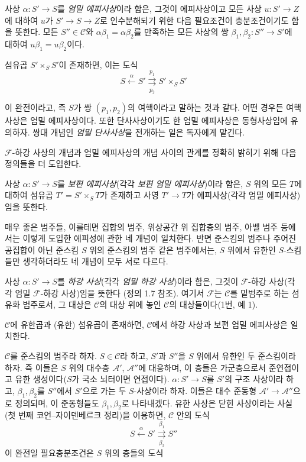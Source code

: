  사상 $\alpha:S'\longrightarrow S$를
\emph{엄밀 에피사상}이라 함은, 그것이 에피사상이고 모든 사상
$u:S'\longrightarrow Z$에 대하여 $u$가
$S'\longrightarrow S\longrightarrow Z$로 인수분해되기 위한 다음
필요조건이 충분조건이기도 함을 뜻한다. 모든 $S''\in\mathcal C$와
$\alpha\beta_1=\alpha\beta_2$를 만족하는 모든 사상의 쌍
$\beta_1,\beta_2:S''\longrightarrow S'$에 대하여
$u\beta_1=u\beta_2$이다.

섬유곱 $S'\times_S S'$이 존재하면, 이는 도식
\[
  S\xleftarrow{\alpha}S'
  \overset{p_1}{\underset{p_2}{\rightrightarrows}}S'\times_S S'
\]

이 완전이라고, 즉 $S$가 쌍 $(p_1,p_2)$의 여핵이라고 말하는 것과
같다. 어떤 경우든 여핵 사상은 엄밀 에피사상이다. 또한 단사사상이기도
한 엄밀 에피사상은 동형사상임에 유의하자. 쌍대 개념인
\emph{엄밀 단사사상}을 전개하는 일은 독자에게 맡긴다.

$\mathcal F$-하강 사상의 개념과 엄밀 에피사상의 개념 사이의 관계를
정확히 밝히기 위해 다음 정의들을 더 도입한다.

 사상 $\alpha:S'\longrightarrow S$를
\emph{보편 에피사상}(각각 \emph{보편 엄밀 에피사상})이라 함은,
$S$ 위의 모든 $T$에 대하여 섬유곱 $T'=S'\times_ST$가 존재하고
사영 $T'\longrightarrow T$가 에피사상(각각 엄밀 에피사상)임을 뜻한다.

매우 좋은 범주들, 이를테면 집합의 범주, 위상공간 위 집합층의 범주,
아벨 범주 등에서는 이렇게 도입한 에피성에 관한 네 개념이 일치한다.
반면 준스킴의 범주나 주어진 공집합이 아닌 준스킴 $S$ 위의 준스킴의
범주 같은 범주에서는, $S$ 위에서 유한인 $S$-스킴들만 생각하더라도
네 개념이 모두 서로 다르다.

 사상 $\alpha:S'\longrightarrow S$를
\emph{하강 사상}(각각 \emph{엄밀 하강 사상})이라 함은, 그것이
$\mathcal F$-하강 사상(각각 엄밀 $\mathcal F$-하강 사상)임을 뜻한다
(정의 1.7 참조). 여기서 $\mathcal F$는 $\mathcal C$를 밑범주로 하는
섬유화 범주로서, 그 대상은 $\mathcal C$의 대상 위에 놓인
$\mathcal C$의 대상들이다(1번, 예 1).

 $\mathcal C$에 유한곱과 (유한) 섬유곱이 존재하면,
$\mathcal C$에서 하강 사상과 보편 엄밀 에피사상은 일치한다.

 $\mathcal C$를 준스킴의 범주라 하자.
$S\in\mathcal C$라 하고, $S'$과 $S''$을 $S$ 위에서 유한인 두
준스킴이라 하자. 즉 이들은 $S$ 위의 대수층 $\mathcal A'$,
$\mathcal A''$에 대응하며, 이 층들은 가군층으로서 준연접이고
유한 생성이다($S$가 국소 뇌터이면 연접이다).
$\alpha:S'\longrightarrow S$를 $S'$의 구조 사상이라 하고,
$\beta_1,\beta_2$를 $S''$에서 $S'$으로 가는 두 $S$-사상이라 하자.
이들은 대수 준동형 $\mathcal A'\longrightarrow\mathcal A''$으로
정의되며, 이 준동형들도 $\beta_1,\beta_2$로 나타내겠다. 유한 사상은
닫힌 사상이라는 사실(첫 번째 코언--자이덴베르크 정리)을 이용하면,
$\mathcal C$ 안의 도식
\[
  \tag{+}
  S\xleftarrow{\alpha}S'
  \overset{\beta_1}{\underset{\beta_2}{\rightrightarrows}}S''
\]
이 완전일 필요충분조건은 $S$ 위의 층들의 도식

